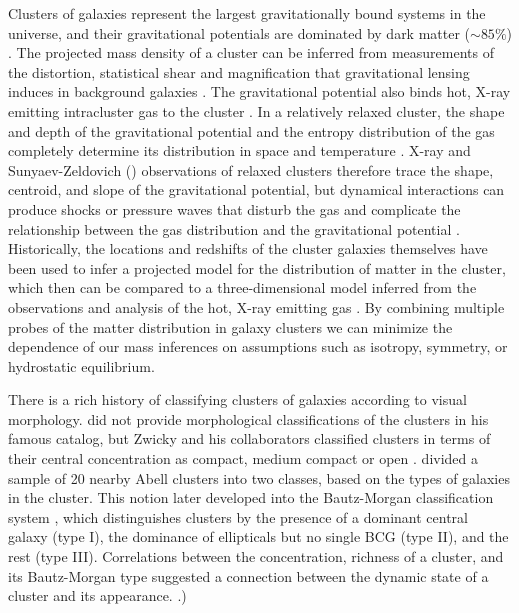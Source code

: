 \documentclass[iop,twocolumn]{emulateapj}
\begin{document}
Clusters of galaxies represent the largest gravitationally bound systems in the universe, 
and their gravitational potentials are dominated by dark matter ($\sim 85\%$) \citep[e.g.][]{2005RvMP...77..207V,2006ApJ...640..691V}. 
The projected mass density of a cluster can be inferred from measurements of the distortion, statistical shear and magnification that gravitational lensing induces in background galaxies 
\citep[e.g.][]{1990ApJ...349L...1T}.
The gravitational potential also binds hot, X-ray emitting intracluster gas to the cluster \citep[e.g.][]{1982ARA&A..20..547F}. 
In a relatively relaxed cluster, the shape and depth of the gravitational potential and the entropy distribution of the gas completely determine its distribution in space and temperature \citep{2001Natur.414..425V}. 
X-ray and Sunyaev-Zeldovich (\citealt{1972CoASP...4..173S})  observations of relaxed clusters therefore trace the shape, centroid, and slope of the gravitational potential, but dynamical interactions can produce shocks or pressure waves that disturb the gas and complicate the relationship between the gas distribution and the gravitational potential \citep{2008ApJ...680...17W}.
Historically, the locations and redshifts of the cluster galaxies themselves have been used to infer a projected model
for the distribution of matter in the cluster, which then can be compared to a three-dimensional model inferred from 
the observations and analysis of the hot, X-ray emitting gas \citep{1983AJ.....88..697K,1989ApJ...336...77F}. 
By combining multiple probes of the matter distribution in galaxy clusters we can 
minimize the dependence of our mass inferences on assumptions such as isotropy, symmetry, or hydrostatic equilibrium.

There is a rich history of classifying clusters of galaxies according to visual morphology.  
\citet{1958ApJS....3..211A} did not provide morphological classifications of the clusters in his famous catalog, but Zwicky and his collaborators classified clusters in terms of their central concentration as compact, medium compact or open \citep[e.g.,][]{1961cgcg.book.....Z}. 
\citet{1961PNAS...47..905M} divided a sample of 20 nearby Abell clusters into two classes, based on the types of galaxies in the cluster.
This notion later developed into the Bautz-Morgan classification system \citep{1970ApJ...162L.149B}, which distinguishes clusters by the presence of a dominant central galaxy (type I), the dominance of ellipticals but no single BCG (type II), and the rest (type III). 
Correlations between the concentration, richness of a cluster, and its Bautz-Morgan type suggested
a connection between the dynamic state of a cluster and its appearance. \citep[See review in][]{1977ARA&A..15..505B}.)
\end{document}
